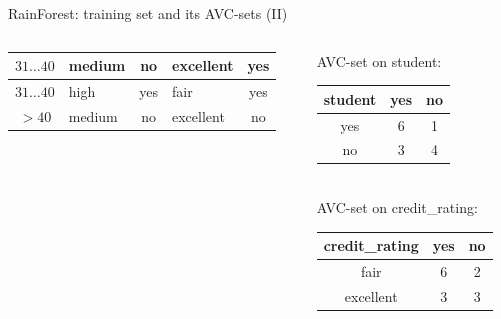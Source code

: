 \documentclass[aspectratio=169,t,table]{beamer}
\begin{document}
{\begin{frame}{RainForest: training set and its AVC-sets (II)}
\begin{columns}
\begin{column}{0.6\textwidth}
\begin{tabular}{|c|l|c|l|c|}
            \cellcolor{yellow!20}$31\ldots40$ & \cellcolor{yellow!20}medium & \cellcolor{yellow!20}no & \cellcolor{yellow!20}excellent & \cellcolor{green!20}yes \\\hline
            \cellcolor{yellow!20}$31\ldots40$ & \cellcolor{yellow!20}high & \cellcolor{yellow!20}yes & \cellcolor{yellow!20}fair & \cellcolor{green!20}yes \\\hline
            \cellcolor{yellow!20}$>40$ & \cellcolor{yellow!20}medium & \cellcolor{yellow!20}no & \cellcolor{yellow!20}excellent & \cellcolor{red!20}no \\\hline
          \end{tabular}
        \end{column}
        \begin{column}{0.3\textwidth}
          \vspace{-3cm}

          \centering
          AVC-set on student:\\
          \begin{tabular}{|c|c|c|}
            \hline
            student & yes & no \\\hline
            yes & 6 & 1 \\\hline
            no & 3 & 4 \\\hline
          \end{tabular}\\[1cm]
          AVC-set on credit\_rating:\\
          \begin{tabular}{|c|c|c|}
            \hline
            credit\_rating & yes & no \\\hline
            fair & 6 & 2 \\\hline
            excellent & 3 & 3 \\\hline
          \end{tabular}
        \end{column}
      \end{columns}
    \end{frame}
  }
\end{document}
